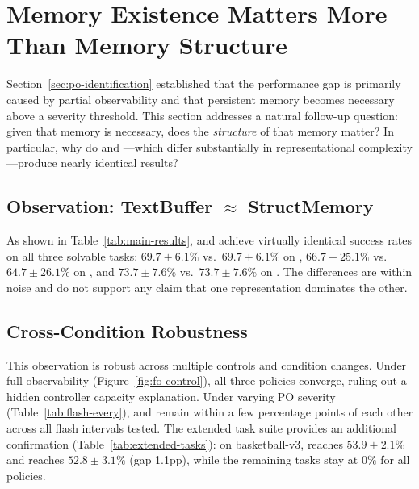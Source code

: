 \section{Memory Existence Matters More Than Memory Structure}
\label{sec:memory-structure}

Section~\ref{sec:po-identification} established that the performance gap is primarily caused by partial observability and that persistent memory becomes necessary above a severity threshold. This section addresses a natural follow-up question: given that memory is necessary, does the \emph{structure} of that memory matter? In particular, why do  and ---which differ substantially in representational complexity---produce nearly identical results?

\subsection{Observation: TextBuffer $\approx$ StructMemory}

As shown in Table~\ref{tab:main-results},  and  achieve virtually identical success rates on all three solvable tasks: $69.7 \pm 6.1\%$ vs.\ $69.7 \pm 6.1\%$ on , $66.7 \pm 25.1\%$ vs.\ $64.7 \pm 26.1\%$ on , and $73.7 \pm 7.6\%$ vs.\ $73.7 \pm 7.6\%$ on . The differences are within noise and do not support any claim that one representation dominates the other.

\subsection{Cross-Condition Robustness}

This observation is robust across multiple controls and condition changes. Under full observability (Figure~\ref{fig:fo-control}), all three policies converge, ruling out a hidden controller capacity explanation. Under varying PO severity (Table~\ref{tab:flash-every}),  and  remain within a few percentage points of each other across all flash intervals tested. The extended task suite provides an additional confirmation (Table~\ref{tab:extended-tasks}): on basketball-v3,  reaches $53.9 \pm 2.1\%$ and  reaches $52.8 \pm 3.1\%$ (gap 1.1pp), while the remaining tasks stay at $0\%$ for all policies.


\FloatBarrier


